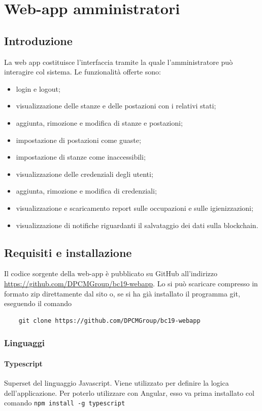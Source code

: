 \section{Web-app amministratori}
\subsection{Introduzione}
La web app costituisce l'interfaccia tramite la quale l'amministratore può interagire col sistema.
Le funzionalità offerte sono:
\begin{itemize}
	\item login e logout;
	\item visualizzazione delle stanze e delle postazioni con i relativi stati;
	\item aggiunta, rimozione e modifica di stanze e postazioni;
	\item impostazione di postazioni come guaste;
	\item impostazione di stanze come inaccessibili;
	\item visualizzazione delle credenziali degli utenti;
	\item aggiunta, rimozione e modifica di credenziali;
	\item visualizzazione e scaricamento report sulle occupazioni e sulle igienizzazioni;
	\item visualizzazione di notifiche riguardanti il salvataggio dei dati sulla blockchain.
\end{itemize}

\subsection{Requisiti e installazione}
Il codice sorgente della web-app è pubblicato su GitHub all'indirizzo \url{https://github.com/DPCMGroup/bc19-webapp}.
Lo si può scaricare compresso in formato zip direttamente dal sito o, se si ha già installato il programma git, eseguendo il comando
\begin{verbatim}
	git clone https://github.com/DPCMGroup/bc19-webapp
\end{verbatim}

\subsubsection{Linguaggi}
\paragraph{Typescript}
Superset del linguaggio Javascript. Viene utilizzato per definire la logica dell'applicazione. \newline
Per poterlo utilizzare con Angular, esso va prima installato col comando \newline
	\texttt{npm install -g typescript}

